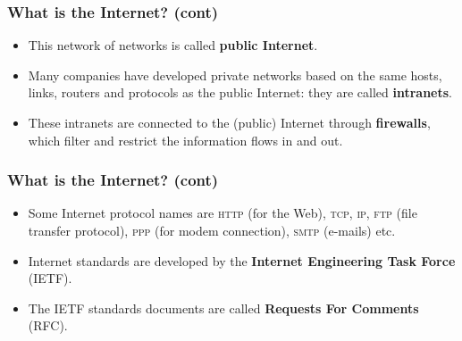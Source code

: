 %
\begin{frame}
\frametitle{What is the Internet? (cont)}

\begin{itemize}

  \item This network of networks is called \textbf{public Internet}.

  \item Many companies have developed private networks based on the
  same hosts, links, routers and protocols as the public Internet:
  they are called \textbf{intranets}.

  \item These intranets are connected to the (public) Internet
  through \textbf{firewalls}, which filter and restrict the
  information flows in and out.

\end{itemize}

\end{frame}

%
\begin{frame}
\frametitle{What is the Internet? (cont)}

\begin{itemize}

  \item Some Internet protocol names are \textsc{http} (for the Web),
  \textsc{tcp}, \textsc{ip}, \textsc{ftp} (file transfer protocol),
  \textsc{ppp} (for modem connection), \textsc{smtp} (e-mails) etc.

  \item Internet standards are developed by the \textbf{Internet
  Engineering Task Force} (IETF).

  \item The IETF standards documents are called \textbf{Requests For
  Comments} (RFC).

\end{itemize}

\end{frame}

